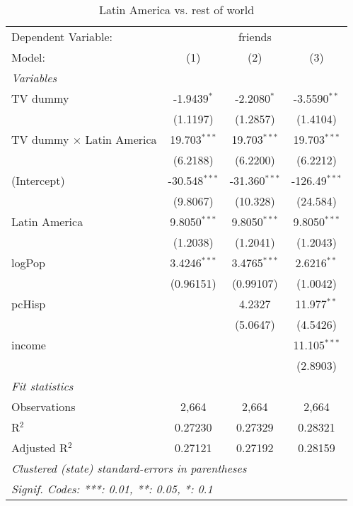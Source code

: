 \begin{table}[htbp]
\centering
\caption{Latin America vs. rest of world}
\begin{tabular}{lccc}
\tabularnewline\midrule\midrule
Dependent Variable:&\multicolumn{3}{c}{friends}\\
Model:&(1) & (2) & (3)\\
\midrule \emph{Variables}&   &   &  \\
TV dummy & -1.9439$^{*}$ & -2.2080$^{*}$ & -3.5590$^{**}$\\
  &(1.1197) & (1.2857) & (1.4104)\\
TV dummy $\times$ Latin America & 19.703$^{***}$ & 19.703$^{***}$ & 19.703$^{***}$\\
  &(6.2188) & (6.2200) & (6.2212)\\
(Intercept) & -30.548$^{***}$ & -31.360$^{***}$ & -126.49$^{***}$\\
  &(9.8067) & (10.328) & (24.584)\\
Latin America & 9.8050$^{***}$ & 9.8050$^{***}$ & 9.8050$^{***}$\\
  &(1.2038) & (1.2041) & (1.2043)\\
logPop & 3.4246$^{***}$ & 3.4765$^{***}$ & 2.6216$^{**}$\\
  &(0.96151) & (0.99107) & (1.0042)\\
pcHisp &    & 4.2327 & 11.977$^{**}$\\
  &   & (5.0647) & (4.5426)\\
income &    &    & 11.105$^{***}$\\
  &   &    & (2.8903)\\
\midrule \emph{Fit statistics}&  & & \\
Observations & 2,664&2,664&2,664\\
R$^2$ & 0.27230&0.27329&0.28321\\
Adjusted R$^2$ & 0.27121&0.27192&0.28159\\
\midrule\midrule\multicolumn{4}{l}{\emph{Clustered (state) standard-errors in parentheses}}\\
\multicolumn{4}{l}{\emph{Signif. Codes: ***: 0.01, **: 0.05, *: 0.1}}\\
\end{tabular}
\end{table}

